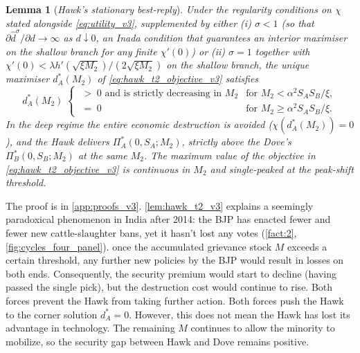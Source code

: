 \documentclass[11pt,twoside]{extarticle}
\newtheorem{lemma}{Lemma}
\begin{document}
\begin{lemma}[\emph{Hawk's stationary best-reply}]\label{lem:hawk_t2_v3}
Under the regularity conditions on $\chi$ stated alongside \eqref{eq:utility_v3}, supplemented by either (i) $\sigma<1$ (so that $\partial\hat d^\sigma/\partial d\to\infty$ as $d\downarrow 0$, an Inada condition that guarantees an interior maximiser on the shallow branch for any finite $\chi'(0)$) or (ii) $\sigma=1$ together with $\chi'(0)<\lambda h'(\sqrt{\xi M_2})/(2\sqrt{\xi M_2})$ on the shallow branch, the unique maximiser $d_A^*(M_2)$ of \eqref{eq:hawk_t2_objective_v3} satisfies
\begin{equation}\label{eq:dA_t2_v3}
    d_A^*(M_2)\;\begin{cases}
    \;>\;0 \text{ and is strictly decreasing in }M_2 & \text{for }M_2<\alpha^2 S_A S_B/\xi,\\[2pt]
    \;=\;0 & \text{for }M_2\ge\alpha^2 S_A S_B/\xi.
    \end{cases}
\end{equation}
In the deep regime the entire economic destruction is avoided ($\chi(d_A^*(M_2))=0$), and the Hawk delivers $\Pi_A^*(0,S_A;M_2)$, strictly above the Dove's $\Pi_B^*(0,S_B;M_2)$ at the same $M_2$. The maximum value of the objective in \eqref{eq:hawk_t2_objective_v3} is continuous in $M_2$ and single-peaked at the peak-shift threshold.
\end{lemma}

The proof is in \autoref{app:proofs_v3}.
\autoref{lem:hawk_t2_v3} explains a seemingly paradoxical phenomenon in India after 2014: the BJP has enacted fewer and fewer new cattle-slaughter bans, yet it hasn't lost any votes (\autoref{fact:2},
  \autoref{fig:cycles_four_panel}).
once the accumulated grievance stock $M$ exceeds a certain threshold, any further new policies by the BJP would result in losses on both ends. Consequently, the security premium would start to decline (having passed the single pick), but the destruction cost would continue to rise. Both forces prevent the Hawk from taking further action.
Both forces push the Hawk to the corner solution $d_A^*=0$. However, this does not mean the Hawk has lost its advantage in technology. The remaining $M$ continues to allow the minority to mobilize, so the security gap between Hawk and Dove remains positive. 
\end{document}

